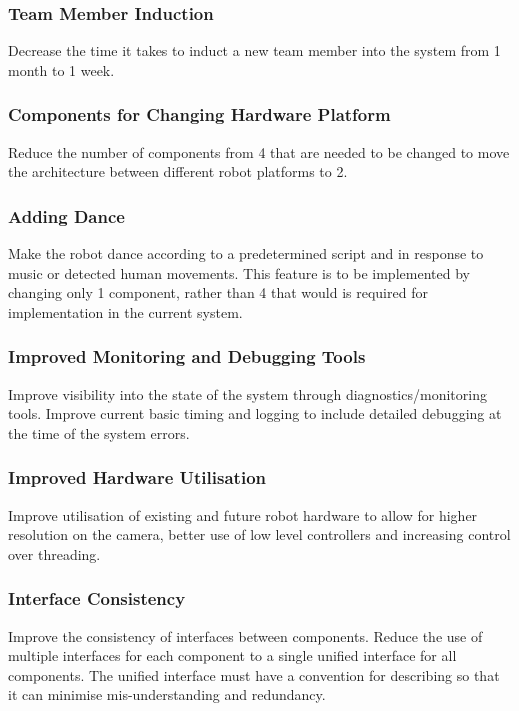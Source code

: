\documentclass[english,12pt]{scrartcl}
\begin{document}
			\subsubsection{Team Member Induction}
				Decrease the time it takes to induct a new team member into the system from 1 month to 1 week.

			\subsubsection{Components for Changing Hardware Platform}
				Reduce the number of components from 4 that are needed to be changed to move the architecture between different robot platforms to 2.

			\subsubsection{Adding Dance}
				Make the robot dance according to a predetermined script and in response to music or detected human movements.
				This feature is to be implemented by changing only 1 component, rather than 4 that would is required for implementation in the current system.

			\subsubsection{Improved Monitoring and Debugging Tools}
				Improve visibility into the state of the system through diagnostics/monitoring tools.
				Improve current basic timing and logging to include detailed debugging at the time of the system errors.

			\subsubsection{Improved Hardware Utilisation}
				Improve utilisation of existing and future robot hardware to allow for higher resolution on the camera, better use of low level controllers and increasing control over threading.

			\subsubsection{Interface Consistency}
				Improve the consistency of interfaces between components.
				Reduce the use of multiple interfaces for each component to a single unified interface for all components.
				The unified interface must have a convention for describing so that it can minimise mis-understanding and redundancy.
\end{document}
